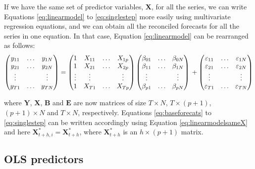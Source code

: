 \documentclass[11pt,a4paper,]{article}
\begin{document}
If we have the same set of predictor variables, \(\bm{X}\), for all the
series, we can write Equations \eqref{eq:linearmodel} to
\eqref{eq:singlestep} more easily using multivariate regression equations,
and we can obtain all the reconciled forecasts for all the series in one
equation. In that case, Equation \eqref{eq:linearmodel} can be rearranged
as follows: \begin{equation}\label{eq:linearmodelsameX}
  \begin{pmatrix}
  y_{11} & \dots & y_{1N}\\
  y_{21} & \dots & y_{2N}\\
  \vdots &       & \vdots\\
  y_{T1} & \dots & y_{TN}
  \end{pmatrix} =
  \begin{pmatrix}
  1      & X_{11} & \dots & X_{1p}\\
  1      & X_{21} & \dots & X_{2p}\\
  \vdots & \vdots &       & \vdots\\
  1      & X_{T1} & \dots & X_{Tp}
  \end{pmatrix}
  \begin{pmatrix}
  \beta_{01} & \dots & \beta_{0N}\\
  \beta_{11} & \dots & \beta_{1N}\\
  \vdots     &       & \vdots\\
  \beta_{p1} & \dots & \beta_{pN}
  \end{pmatrix} \\
  +
  \begin{pmatrix}
  \varepsilon_{11} & \dots & \varepsilon_{1N}\\
  \varepsilon_{21} & \dots & \varepsilon_{2N}\\
  \vdots           &       & \vdots\\
  \varepsilon_{T1} & \dots & \varepsilon_{TN}
  \end{pmatrix}
\end{equation}

where \(\bm{Y}\), \(\bm{X}\), \(\bm{B}\) and \(\bm{E}\) are now matrices
of size \(T\times N\), \(T\times (p+1)\), \((p+1)\times N\) and
\(T \times N\), respectively. Equations \eqref{eq:baseforecats} to
\eqref{eq:singlestep} can be written accordingly using Equation
\eqref{eq:linearmodelsameX} and here
\(\bm{X}^*_{t+h,i} = \bm{X}^*_{t+h}\), where \(\bm{X}^*_{t+h}\) is an
\(h\times (p+1)\) matrix.

\hypertarget{ols-predictors}{%
\subsection{OLS predictors}\label{ols-predictors}}
\end{document}
